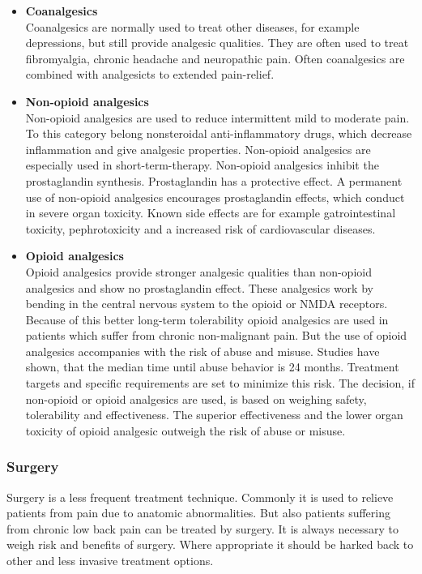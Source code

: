 \begin{itemize}
\item \textbf{Coanalgesics}\\
Coanalgesics are normally used to treat other diseases, for example depressions, but still provide analgesic qualities. They are often used to treat fibromyalgia, chronic headache and neuropathic pain. Often coanalgesics are combined with analgesicts to extended pain-relief. \cite{marcus2009}

\item \textbf{Non-opioid analgesics}\\
Non-opioid analgesics are used to reduce intermittent mild to moderate pain. To this category belong nonsteroidal anti-inflammatory drugs, which decrease inflammation and give analgesic properties. Non-opioid analgesics are especially used in short-term-therapy. Non-opioid analgesics inhibit the prostaglandin synthesis. Prostaglandin has a protective effect. A permanent use of non-opioid analgesics encourages prostaglandin effects, which conduct in severe organ toxicity. Known side effects are for example gatrointestinal toxicity, pephrotoxicity and a increased risk of cardiovascular diseases. \cite{marcus2009,stein2007}

\item \textbf{Opioid analgesics}\\
Opioid analgesics provide stronger analgesic qualities than non-opioid analgesics and show no prostaglandin effect. These analgesics work by bending in the central nervous system to the opioid or NMDA receptors.  Because of this better long-term tolerability opioid analgesics are used in patients which suffer from chronic non-malignant pain. But the use of opioid analgesics accompanies with the risk of abuse and misuse. Studies have shown, that the median time until abuse behavior is 24 months. Treatment targets and specific requirements are set to minimize this risk. \cite{marcus2009,stein2007}
The decision, if non-opioid or opioid analgesics are used, is based on weighing safety, tolerability and effectiveness. The superior effectiveness and the lower organ toxicity of opioid analgesic outweigh the risk of abuse or misuse. \cite{marcus2009} 
\end{itemize}

\subsubsection{Surgery}
Surgery is a less frequent treatment technique. Commonly it is used to relieve patients from pain due to anatomic abnormalities. \cite{marcus2009,pope2017} But also patients suffering from chronic low back pain can be treated by surgery. It is always necessary to weigh risk and benefits of surgery. Where appropriate it should be harked back to other and less invasive treatment options. \cite{pope2017}


